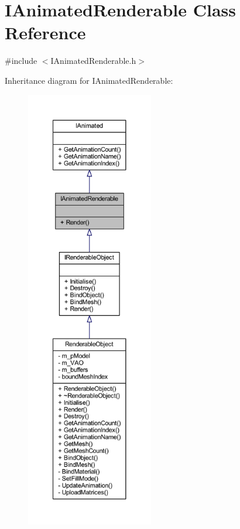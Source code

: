 \hypertarget{class_i_animated_renderable}{}\section{I\+Animated\+Renderable Class Reference}
\label{class_i_animated_renderable}


{\ttfamily \#include $<$I\+Animated\+Renderable.\+h$>$}



Inheritance diagram for I\+Animated\+Renderable\+:
\nopagebreak
\begin{figure}[H]
\begin{center}
\leavevmode
\includegraphics[height=550pt]{class_i_animated_renderable__inherit__graph}
\end{center}
\end{figure}


